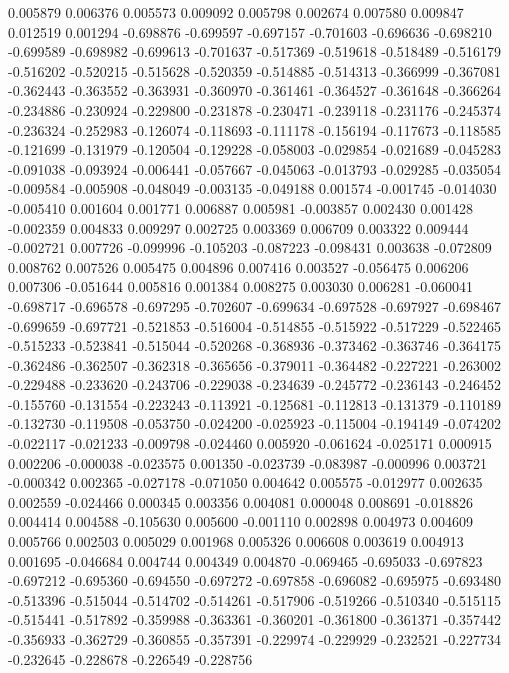 0.005879
0.006376
0.005573
0.009092
0.005798
0.002674
0.007580
0.009847
0.012519
0.001294
-0.698876
-0.699597
-0.697157
-0.701603
-0.696636
-0.698210
-0.699589
-0.698982
-0.699613
-0.701637
-0.517369
-0.519618
-0.518489
-0.516179
-0.516202
-0.520215
-0.515628
-0.520359
-0.514885
-0.514313
-0.366999
-0.367081
-0.362443
-0.363552
-0.363931
-0.360970
-0.361461
-0.364527
-0.361648
-0.366264
-0.234886
-0.230924
-0.229800
-0.231878
-0.230471
-0.239118
-0.231176
-0.245374
-0.236324
-0.252983
-0.126074
-0.118693
-0.111178
-0.156194
-0.117673
-0.118585
-0.121699
-0.131979
-0.120504
-0.129228
-0.058003
-0.029854
-0.021689
-0.045283
-0.091038
-0.093924
-0.006441
-0.057667
-0.045063
-0.013793
-0.029285
-0.035054
-0.009584
-0.005908
-0.048049
-0.003135
-0.049188
0.001574
-0.001745
-0.014030
-0.005410
0.001604
0.001771
0.006887
0.005981
-0.003857
0.002430
0.001428
-0.002359
0.004833
0.009297
0.002725
0.003369
0.006709
0.003322
0.009444
-0.002721
0.007726
-0.099996
-0.105203
-0.087223
-0.098431
0.003638
-0.072809
0.008762
0.007526
0.005475
0.004896
0.007416
0.003527
-0.056475
0.006206
0.007306
-0.051644
0.005816
0.001384
0.008275
0.003030
0.006281
-0.060041
-0.698717
-0.696578
-0.697295
-0.702607
-0.699634
-0.697528
-0.697927
-0.698467
-0.699659
-0.697721
-0.521853
-0.516004
-0.514855
-0.515922
-0.517229
-0.522465
-0.515233
-0.523841
-0.515044
-0.520268
-0.368936
-0.373462
-0.363746
-0.364175
-0.362486
-0.362507
-0.362318
-0.365656
-0.379011
-0.364482
-0.227221
-0.263002
-0.229488
-0.233620
-0.243706
-0.229038
-0.234639
-0.245772
-0.236143
-0.246452
-0.155760
-0.131554
-0.223243
-0.113921
-0.125681
-0.112813
-0.131379
-0.110189
-0.132730
-0.119508
-0.053750
-0.024200
-0.025923
-0.115004
-0.194149
-0.074202
-0.022117
-0.021233
-0.009798
-0.024460
0.005920
-0.061624
-0.025171
0.000915
0.002206
-0.000038
-0.023575
0.001350
-0.023739
-0.083987
-0.000996
0.003721
-0.000342
0.002365
-0.027178
-0.071050
0.004642
0.005575
-0.012977
0.002635
0.002559
-0.024466
0.000345
0.003356
0.004081
0.000048
0.008691
-0.018826
0.004414
0.004588
-0.105630
0.005600
-0.001110
0.002898
0.004973
0.004609
0.005766
0.002503
0.005029
0.001968
0.005326
0.006608
0.003619
0.004913
0.001695
-0.046684
0.004744
0.004349
0.004870
-0.069465
-0.695033
-0.697823
-0.697212
-0.695360
-0.694550
-0.697272
-0.697858
-0.696082
-0.695975
-0.693480
-0.513396
-0.515044
-0.514702
-0.514261
-0.517906
-0.519266
-0.510340
-0.515115
-0.515441
-0.517892
-0.359988
-0.363361
-0.360201
-0.361800
-0.361371
-0.357442
-0.356933
-0.362729
-0.360855
-0.357391
-0.229974
-0.229929
-0.232521
-0.227734
-0.232645
-0.228678
-0.226549
-0.228756
